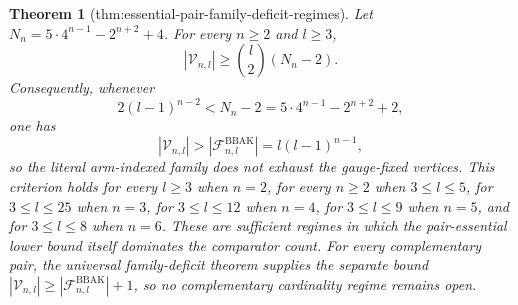 \documentclass{article}
\newtheorem{theorem}{Theorem}
\begin{document}
\begin{theorem}[thm:essential-pair-family-deficit-regimes]\label{thm:essential-pair-family-deficit-regimes}
Let \(N_n=5\cdot4^{n-1}-2^{n+2}+4\). For every \(n\ge2\) and \(l\ge3\), \[|\mathcal V_{n,l}|\ge \binom{l}{2}(N_n-2).\] Consequently, whenever \[2(l-1)^{n-2}<N_n-2=5\cdot4^{n-1}-2^{n+2}+2,\] one has \[|\mathcal V_{n,l}|>|\mathcal F^{\mathrm{BBAK}}_{n,l}|=l(l-1)^{n-1},\] so the literal arm-indexed family does not exhaust the gauge-fixed vertices. This criterion holds for every \(l\ge3\) when \(n=2\), for every \(n\ge2\) when \(3\le l\le5\), for \(3\le l\le25\) when \(n=3\), for \(3\le l\le12\) when \(n=4\), for \(3\le l\le9\) when \(n=5\), and for \(3\le l\le8\) when \(n=6\). These are sufficient regimes in which the pair-essential lower bound itself dominates the comparator count. For every complementary pair, the universal family-deficit theorem supplies the separate bound \(|\mathcal V_{n,l}|\ge|\mathcal F^{\mathrm{BBAK}}_{n,l}|+1\), so no complementary cardinality regime remains open.
\end{theorem}
\end{document}
